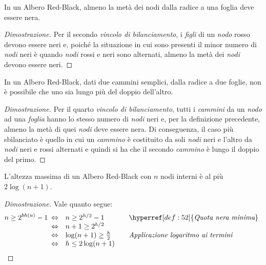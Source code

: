 \begin{definition}
    In un Albero Red-Black, almeno la metà dei nodi dalla radice a una foglia
    deve essere nera.
\end{definition}
\begin{proof}[Dimostrazione]
    Per il secondo \emph{vincolo di bilanciamento}, i \emph{figli} di un
    \emph{nodo} rosso devono essere neri e, poiché la situazione in cui sono
    presenti il minor numero di \emph{nodi} neri è quando \emph{nodi} rossi
    e neri sono alternati, almeno la metà dei \emph{nodi} devono essere neri.
\end{proof}

\begin{definition}
    In un Albero Red-Black, dati due cammini semplici, dalla radice a due
    foglie, non è possibile che uno sia lungo più del doppio dell'altro.
\end{definition}
\begin{proof}[Dimostrazione]
    Per il quarto \emph{vincolo di bilanciamento}, tutti i \emph{cammini} da
    un \emph{nodo} ad una \emph{foglia} hanno lo stesso numero di \emph{nodi}
    neri e, per la definizione precedente, almeno la metà di quei \emph{nodi}
    deve essere nera. Di conseguenza, il caso più sbilanciato è quello in cui
    un \emph{cammino} è costituito da soli \emph{nodi} neri e l'altro da
    \emph{nodi} neri e rossi alternati e quindi si ha che il secondo \emph{cammino}
    è lungo il doppio del primo.
\end{proof}

\begin{definition}
    L'altezza massima di un Albero Red-Black con $n$ nodi interni è al più
    $2\log(n+1)$.
\end{definition}
\begin{proof}[Dimostrazione]
    Vale quanto segue:
    \[n\geq2^{bh(u)}-1\begin{array}[t]{cll}
        \Leftrightarrow & n\geq2^{h/2}-1 & \quad\hyperref[def:52]{\emph{Quota nera minima}}\\
        \Leftrightarrow & n+1\geq2^{h/2}\\
        \Leftrightarrow & \log(n+1)\geq\frac{h}{2} & \quad\emph{Applicazione logaritmo ai termini}\\
        \Leftrightarrow & h\leq2\log(n+1)
    \end{array}\]
\end{proof}


